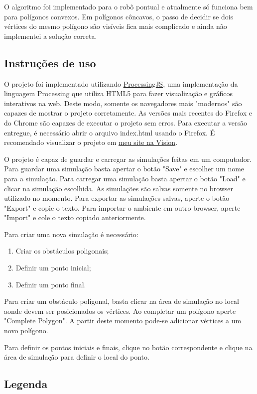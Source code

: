 \documentclass[11pt]{article} %
\begin{document}
O algoritmo foi implementado para o robô pontual e atualmente só funciona bem para polígonos convexos. Em polígonos côncavos, o passo de decidir se dois vértices do mesmo polígono são visíveis fica mais complicado e ainda não implementei a solução correta.

\subsection{Instruções de uso}

O projeto foi implementado utilizando  \href{http://processingjs.org/}{ProcessingJS}, uma implementação da linguagem Processing que utiliza HTML5 para fazer visualização e gráficos interativos na web. Deste modo, somente os navegadores mais "modernos" são capazes de mostrar o projeto corretamente. As versões mais recentes do Firefox e do Chrome são capazes de executar o projeto sem erros. Para executar a versão entregue, é necessário abrir o arquivo index.html usando o Firefox. É recomendado visualizar o projeto em \href{http://vision.ime.usp.br/~igor/geocomp}{meu site na Vision}.

O projeto é capaz de guardar e carregar as simulações feitas em um computador. Para guardar uma simulação basta apertar o botão "Save" e escolher um nome para a simulação. Para carregar uma simulação basta apertar o botão "Load" e clicar na simulação escolhida. As simulações são salvas somente no browser utilizado no momento. Para exportar as simulações salvas, aperte o botão "Export" e copie o texto. Para importar o ambiente em outro browser, aperte "Import" e cole o texto copiado anteriormente.

Para criar uma nova simulação é necessário:
\begin{enumerate}
	\item Criar os obstáculos poligonais;
	\item Definir um ponto inicial;
	\item Definir um ponto final.
\end{enumerate}

Para criar um obstáculo poligonal, basta clicar na área de simulação no local aonde devem ser posicionados os vértices. Ao completar um polígono aperte "Complete Polygon". A partir deste momento pode-se adicionar vértices a um novo polígono.

Para definir os pontos iniciais e finais, clique no botão correspondente e clique na área de simulação para definir o local do ponto.

\subsection{Legenda}
\end{document}

